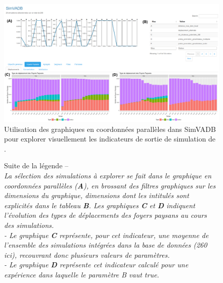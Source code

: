 \begin{figure}[H]
	\centering
	\captionsetup{width=\linewidth}
	\includegraphics[height=.86\linewidth,angle=90]{img/SimVADB_Dashboard2_annote_retouche.png}
	\caption[Utilisation des graphiques en coordonnées parallèles dans SimVADB pour explorer visuellement les indicateurs de sortie de simulation de \simfeodal{}.]{Utilisation des graphiques en coordonnées parallèles dans SimVADB pour explorer visuellement les indicateurs de sortie de simulation de \simfeodal{}.}
	\label{fig:simvadb_dashboard}
\end{figure}
\clearpage

\addtocounter{figure}{-1}
\begin{figure}[H]
	\vspace*{2em}\caption[exemple]{Suite de la légende --\\
\textit{La sélection des simulations à explorer se fait dans le graphique en coordonnées parallèles (\textbf{A}), en \og brossant\fg{} des filtres graphiques sur les \og dimensions\fg{} du graphique, dimensions dont les intitulés sont explicités dans le tableau \textbf{B}.	Les graphiques \textbf{C} et \textbf{D} indiquent l'évolution des types de déplacements des foyers paysans au cours des simulations.\\
- Le graphique \textbf{C} représente, pour cet indicateur, une moyenne de l'ensemble des simulations intégrées dans la base de données (260 ici), recouvrant donc plusieurs valeurs de paramètres.\\
- Le graphique \textbf{D} représente cet indicateur calculé pour une expérience dans laquelle le paramètre \og \textsf{B} \fg{} vaut \textsf{true}.}	
}
\end{figure}

